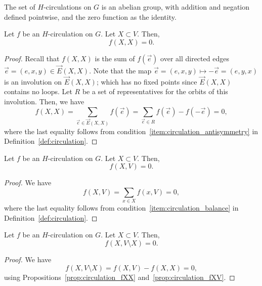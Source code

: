 \begin{proposition} \label{prop:circulation_abelian_group}
	The set of \(H\)-circulations on \(G\) is an abelian group, with addition and negation defined pointwise, and the zero function as the identity.
\end{proposition}

\begin{proposition} \label{prop:circulation_fXX}
	Let \(f\) be an \(H\)-circulation on \(G\).
	Let \(X \subset V\).
	Then,
	\begin{equation}
		f(X, X) = 0.
	\end{equation}
\end{proposition}

\begin{proof}
	Recall that \(f(X, X)\) is the sum of \(f(\vec{e})\) over all directed edges \(\vec{e} = (e, x, y)\in \vec{E}(X, X)\).
	Note that the map \(\vec{e} = (e, x, y) \mapsto -\vec{e} = (e, y, x)\) is an involution on \(\vec{E}(X, X)\); which has no fixed points since \(\vec{E}(X, X)\) contains no loops.
	Let \(R\) be a set of representatives for the orbits of this involution.
	Then, we have
	\begin{equation}
		f(X, X) = \sum_{\vec{e} \in \vec{E}(X, X)} f(\vec{e}) = \sum_{\vec{e} \in R} f(\vec{e}) - f(-\vec{e}) = 0,
	\end{equation}
	where the last equality follows from condition~\ref{item:circulation_antisymmetry} in Definition~\ref{def:circulation}.
\end{proof}

\begin{proposition} \label{prop:circulation_fXV}
	Let \(f\) be an \(H\)-circulation on \(G\).
	Let \(X \subset V\).
	Then,
	\begin{equation}
		f(X, V) = 0.
	\end{equation}
\end{proposition}

\begin{proof}
	We have
	\begin{equation}
		f(X, V) = \sum_{x \in X} f(x, V) = 0,
	\end{equation}
	where the last equality follows from condition~\ref{item:circulation_balance} in Definition~\ref{def:circulation}.
\end{proof}

\begin{lemma} \label{lem:circulation_fXVX}
	Let \(f\) be an \(H\)-circulation on \(G\).
	Let \(X \subset V\). Then,
	\begin{equation}
		f(X, V \setminus X) = 0.
	\end{equation}
\end{lemma}
\begin{proof}
	We have
	\begin{equation}
		f(X, V \setminus X) = f(X, V) - f(X, X) = 0,
	\end{equation}
	using Propositions~\ref{prop:circulation_fXX} and~\ref{prop:circulation_fXV}.
\end{proof}

